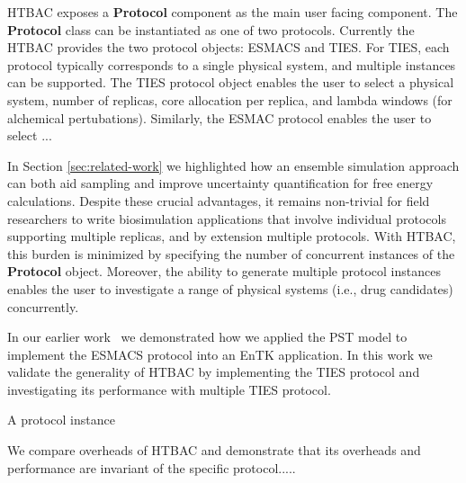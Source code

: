 HTBAC exposes a \textbf{Protocol} component as the main user facing component. The \textbf{Protocol} class can be instantiated as one of two protocols.
Currently the HTBAC provides the two protocol objects: ESMACS and TIES. For
TIES, each protocol typically corresponds to a single physical system, and
multiple instances can be supported. The TIES protocol object enables the user
to select a physical system, number of replicas, core allocation per replica,
and lambda windows (for alchemical pertubations). Similarly, the ESMAC
protocol enables the user to select ...



	In Section \ref{sec:related-work} we highlighted how an ensemble
simulation approach can both aid sampling and improve uncertainty
quantification for free energy calculations. Despite these crucial advantages,
it remains non-trivial for field researchers to write biosimulation
applications that involve individual protocols supporting multiple replicas,
and by extension multiple protocols. With HTBAC, this burden is minimized by
specifying the number of concurrent instances of the \textbf{Protocol} object.
Moreover, the ability to generate multiple protocol instances enables the user
to investigate a range of physical systems (i.e., drug candidates)
concurrently.


	In our earlier work~\cite{dakka2017} we demonstrated how we applied the
PST model to implement the ESMACS protocol into an EnTK application. In this
work we validate the generality of HTBAC by implementing the TIES protocol and
investigating its performance with multiple TIES protocol. 


A protocol instance

We compare
overheads of HTBAC and demonstrate that its overheads and performance are
invariant of the specific protocol..... 


